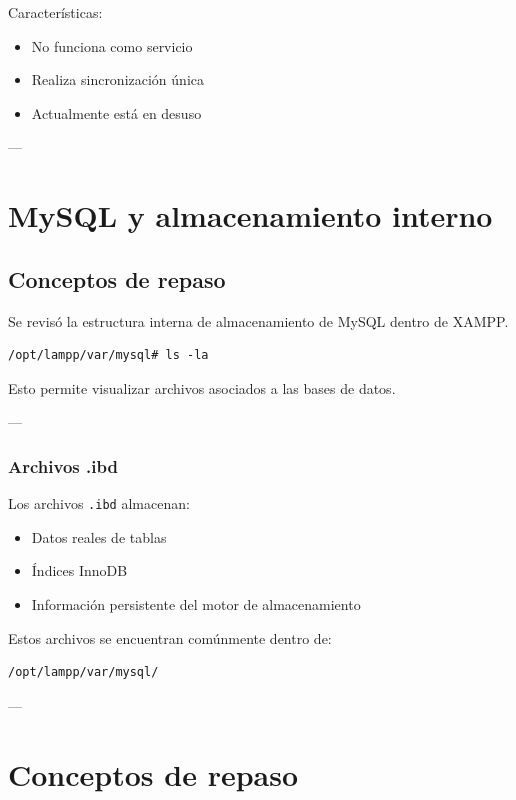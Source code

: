 \documentclass[11pt, letterpaper]{article}
\begin{document}
Características:

\begin{itemize}
\item No funciona como servicio
\item Realiza sincronización única
\item Actualmente está en desuso
\end{itemize}

---
\section{MySQL y almacenamiento interno}
\label{sec:org429bd81}

\subsection{Conceptos de repaso}
\label{sec:orgc2b4dd9}

Se revisó la estructura interna de almacenamiento de MySQL dentro de XAMPP.

\begin{verbatim}
/opt/lampp/var/mysql# ls -la
\end{verbatim}

Esto permite visualizar archivos asociados a las bases de datos.

---
\subsubsection{Archivos .ibd}
\label{sec:org6b5ccfa}

Los archivos \texttt{.ibd} almacenan:

\begin{itemize}
\item Datos reales de tablas
\item Índices InnoDB
\item Información persistente del motor de almacenamiento
\end{itemize}

Estos archivos se encuentran comúnmente dentro de:

\begin{verbatim}
/opt/lampp/var/mysql/
\end{verbatim}

---
\section{Conceptos de repaso}
\label{sec:orgdc44530}
\end{document}
